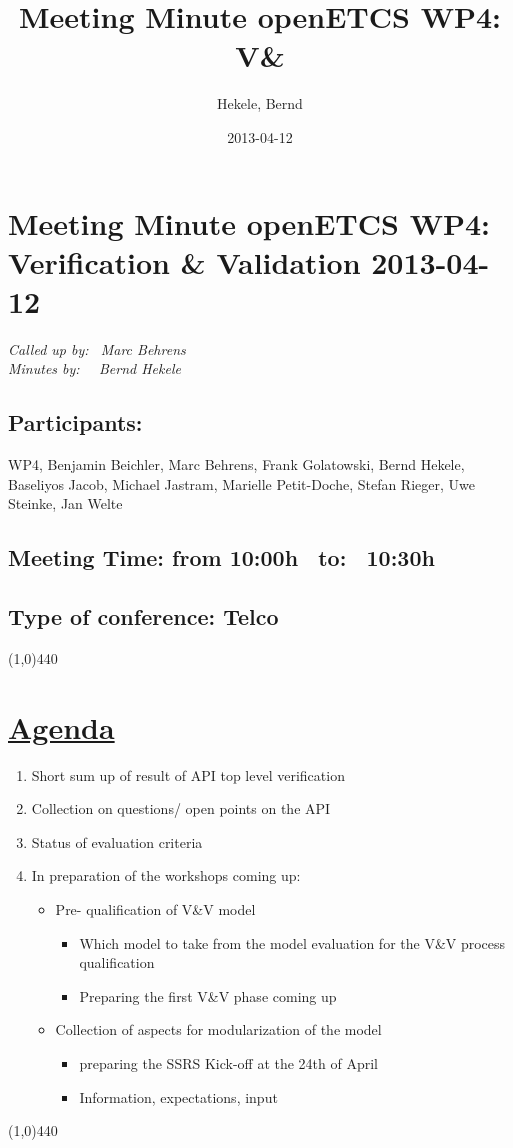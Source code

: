 \documentclass[a4paper]{article}
\title{Meeting Minute openETCS WP4: V&\V}
\author{Hekele, Bernd}
\date{2013-04-12}
\begin{document}
\section*{\large{Meeting Minute openETCS WP4: Verification \& Validation 2013-04-12}}

\emph{Called up by: \ Marc Behrens}\\
\emph{Minutes by: \ \  Bernd Hekele}


\subsection*{Participants:} WP4, 
Benjamin Beichler,
Marc Behrens, 
Frank Golatowski, 
Bernd Hekele,
Baseliyos Jacob,
Michael Jastram, 
Marielle Petit-Doche, 
Stefan Rieger,
Uwe Steinke,
Jan Welte\\

\subsection*{Meeting Time: from 10:00h \ to: \ 10:30h}

\subsection*{Type of conference: Telco}

\line(1,0){440}
\section*{\underline{Agenda}}
\begin{enumerate}
\item Short sum up of result of API top level verification
\item Collection on questions/ open points on the API
\item Status of evaluation criteria
\item In preparation of the workshops coming up: 
\begin{itemize}
\item Pre- qualification of V\&V model 
\begin{itemize}
\item Which model to take from the model evaluation for the V\&V process qualification
\item Preparing the first V\&V phase coming up
\end{itemize}
\item Collection of aspects for modularization of the model 
\begin{itemize}
\item preparing the SSRS Kick-off at the 24th of April
\item Information, expectations, input
\end{itemize}
\end{itemize}
\end{enumerate}
\line(1,0){440}
\end{document}
